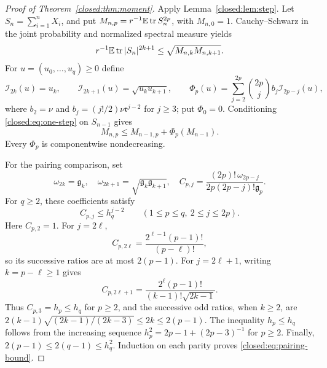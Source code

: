 \documentclass[11pt,a4paper]{article}
\theoremstyle{definition}\newtheorem{definition}[theorem]{Definition}
\theoremstyle{remark}\newtheorem{remark}[theorem]{Remark}
\numberwithin{equation}{section}
\newcommand{\gmom}{\mathfrak g}
\newcommand{\Rmom}{\mathfrak r}
\DeclareMathOperator{\tr}{tr}\DeclareMathOperator{\rank}{rank}
\begin{document}
\begin{proof}[Proof of Theorem~\ref{closed:thm:moment}]
Apply Lemma~\ref{closed:lem:step}.
Let $S_n=\sum_{i=1}^nX_i$, and put
$M_{n,p}=r^{-1}\E\tr S_n^{2p}$, with $M_{n,0}=1$.
Cauchy--Schwarz in the joint probability and normalized spectral
measure yields
\[
 r^{-1}\E\tr|S_n|^{2k+1}\le\sqrt{M_{n,k}M_{n,k+1}}.
\]
For $u=(u_0,\ldots,u_q)\ge0$ define
\begin{equation}\label{core:eq:interpolation}
 \mathcal I_{2k}(u)=u_k,\qquad
 \mathcal I_{2k+1}(u)=\sqrt{u_ku_{k+1}},\qquad
 \Phi_p(u)=\sum_{j=2}^{2p}\binom{2p}{j}b_j\mathcal I_{2p-j}(u),
\end{equation}
where $b_2=\nu$ and $b_j=(j!/2)\nu\Rmom^{j-2}$ for $j\ge3$;
put $\Phi_0=0$. Conditioning \eqref{closed:eq:one-step} on
$S_{n-1}$ gives
\begin{equation}\label{closed:eq:update}
 M_{n,p}\le M_{n-1,p}+\Phi_p(M_{n-1}).
\end{equation}
Every $\Phi_p$ is componentwise nondecreasing.

For the pairing comparison, set
\begin{equation}\label{core:eq:pairing}
 \omega_{2k}=\gmom_k,\quad
 \omega_{2k+1}=\sqrt{\gmom_k\gmom_{k+1}},\quad
 C_{p,j}=\frac{(2p)!\,\omega_{2p-j}}
                   {2p(2p-j)!\gmom_p}.
\end{equation}
For $q\ge2$, these coefficients satisfy
\begin{equation}\label{closed:eq:pairing-bound}
 C_{p,j}\le h_q^{j-2}\qquad(1\le p\le q,\ 2\le j\le2p).
\end{equation}
Here $C_{p,2}=1$. For $j=2\ell$,
\[
 C_{p,2\ell}=\frac{2^{\ell-1}(p-1)!}{(p-\ell)!},
\]
so its successive ratios are at most $2(p-1)$. For $j=2\ell+1$,
writing $k=p-\ell\ge1$ gives
\[
 C_{p,2\ell+1}=\frac{2^\ell(p-1)!}{(k-1)!\sqrt{2k-1}}.
\]
Thus $C_{p,3}=h_p\le h_q$ for $p\ge2$, and the successive odd
ratios, when $k\ge2$, are
$2(k-1)\sqrt{(2k-1)/(2k-3)}\le2k\le2(p-1)$.
The inequality $h_p\le h_q$ follows from the increasing sequence
$h_p^2=2p-1+(2p-3)^{-1}$ for $p\ge2$.
Finally, $2(p-1)\le2(q-1)\le h_q^2$. Induction on each parity
proves \eqref{closed:eq:pairing-bound}.


\end{proof}
\end{document}
